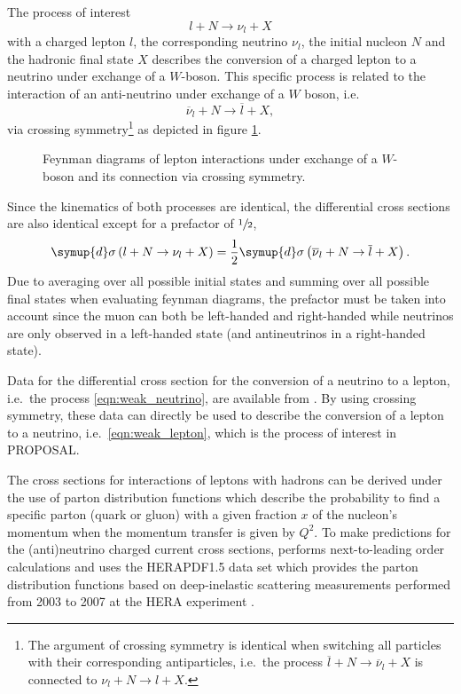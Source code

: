 The process of interest
%
\begin{equation}
    \label{eqn:weak_lepton}
    l + N \rightarrow \nu_l + X
\end{equation}
%
with a charged lepton $l$, the corresponding neutrino $\nu_l$, the initial nucleon $N$ and the hadronic final state $X$ describes the conversion of a charged lepton to a neutrino under exchange of a $W$-boson.
This specific process is related to the interaction of an anti-neutrino under exchange of a $W$ boson, i.e.\
%
\begin{equation}
    \label{eqn:weak_neutrino}
    \overline{\nu}_l + N \rightarrow \overline{l} + X,
\end{equation}
%
via crossing symmetry\footnote{The argument of crossing symmetry is identical when switching all particles with their corresponding antiparticles, i.e.\ the process $\overline{l} + N \rightarrow \overline{\nu}_l + X$ is connected to $\nu_l + N \rightarrow l + X$.} as depicted in figure \ref{fig:feynman_weak}.
%
\begin{figure}
    \centering
    
    \caption{Feynman diagrams of lepton interactions under exchange of a $W$-boson and its connection via crossing symmetry.}
    \label{fig:feynman_weak}
\end{figure}
%
Since the kinematics of both processes are identical, the differential cross sections are also identical except for a prefactor of $\sfrac{1}{2}$,
%
\begin{equation}
    \symup{d}\sigma\left( l + N \rightarrow \nu_l + X \right) = \frac{1}{2} \symup{d}\sigma\left( \overline{\nu}_l + N \rightarrow \overline{l} + X \right).
\end{equation}
%
Due to averaging over all possible initial states and summing over all possible final states when evaluating feynman diagrams, the prefactor must be taken into account since the muon can both be left-handed and right-handed while neutrinos are only observed in a left-handed state (and antineutrinos in a right-handed state).

Data for the differential cross section for the conversion of a neutrino to a lepton, i.e.\ the process \eqref{eqn:weak_neutrino}, are available from \cite{Cooper_Sarkar_2011}.
By using crossing symmetry, these data can directly be used to describe the conversion of a lepton to a neutrino, i.e.\ \eqref{eqn:weak_lepton}, which is the process of interest in PROPOSAL.

The cross sections for interactions of leptons with hadrons can be derived under the use of parton distribution functions which describe the probability to find a specific parton (quark or gluon) with a given fraction $x$ of the nucleon's momentum when the momentum transfer is given by $Q^2$.
To make predictions for the (anti)neutrino charged current cross sections, \cite{Cooper_Sarkar_2011} performs next-to-leading order calculations and uses the HERAPDF1.5 data set which provides the parton distribution functions based on deep-inelastic scattering measurements performed from 2003 to 2007 at the HERA experiment \cite{am2010proton}.

